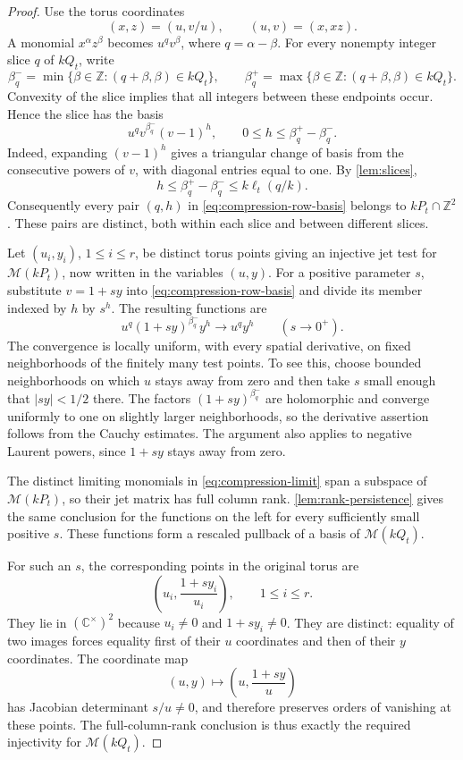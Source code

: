 \begin{proof}
Use the torus coordinates
\[
 (x,z)=(u,v/u),\qquad (u,v)=(x,xz).
\]
A monomial $x^\alpha z^\beta$ becomes $u^qv^\beta$, where $q=\alpha-\beta$.  For every nonempty integer slice $q$ of $kQ_t$, write
\[
 \beta_q^-=
 \min\{\beta\in\mathbb{Z}:(q+\beta,\beta)\in kQ_t\},
 \qquad
 \beta_q^+=
 \max\{\beta\in\mathbb{Z}:(q+\beta,\beta)\in kQ_t\}.
\]
Convexity of the slice implies that all integers between these endpoints occur.  Hence the slice has the basis
\begin{equation}\label{eq:compression-row-basis}
 u^qv^{\beta_q^-}(v-1)^h,
 \qquad 0\le h\le\beta_q^+-\beta_q^-.
\end{equation}
Indeed, expanding $(v-1)^h$ gives a triangular change of basis from the consecutive powers of $v$, with diagonal entries equal to one.  By \cref{lem:slices},
\[
 h\le\beta_q^+-\beta_q^-
 \le k\ell_t(q/k).
\]
Consequently every pair $(q,h)$ in \eqref{eq:compression-row-basis} belongs to $kP_t\cap\mathbb{Z}^2$. These pairs are distinct, both within each slice and between different slices.

Let $(u_i,y_i)$, $1\le i\le r$, be distinct torus points giving an injective jet test for $\mathcal{M}(kP_t)$, now written in the variables $(u,y)$.  For a positive parameter $s$, substitute $v=1+sy$ into \eqref{eq:compression-row-basis} and divide its member indexed by $h$ by $s^h$.  The resulting functions are
\begin{equation}\label{eq:compression-limit}
 u^q(1+sy)^{\beta_q^-}y^h
 \longrightarrow u^qy^h
 \qquad (s\longrightarrow0^+).
\end{equation}
The convergence is locally uniform, with every spatial derivative, on fixed neighborhoods of the finitely many test points.  To see this, choose bounded neighborhoods on which $u$ stays away from zero and then take $s$ small enough that $|sy|<1/2$ there.  The factors $(1+sy)^{\beta_q^-}$ are holomorphic and converge uniformly to one on slightly larger neighborhoods, so the derivative assertion follows from the Cauchy estimates.  The argument also applies to negative Laurent powers, since $1+sy$ stays away from zero.

The distinct limiting monomials in \eqref{eq:compression-limit} span a subspace of $\mathcal{M}(kP_t)$, so their jet matrix has full column rank.  \cref{lem:rank-persistence} gives the same conclusion for the functions on the left for every sufficiently small positive $s$. These functions form a rescaled pullback of a basis of $\mathcal{M}(kQ_t)$.

For such an $s$, the corresponding points in the original torus are
\[
 \left(u_i,\frac{1+sy_i}{u_i}\right),\qquad 1\le i\le r.
\]
They lie in $(\mathbb{C}^\times)^2$ because $u_i\ne0$ and $1+sy_i\ne0$.  They are distinct: equality of two images forces equality first of their $u$ coordinates and then of their $y$ coordinates.  The coordinate map
\[
 (u,y)\longmapsto\left(u,\frac{1+sy}{u}\right)
\]
has Jacobian determinant $s/u\ne0$, and therefore preserves orders of vanishing at these points.  The full-column-rank conclusion is thus exactly the required injectivity for $\mathcal{M}(kQ_t)$.
\end{proof}

